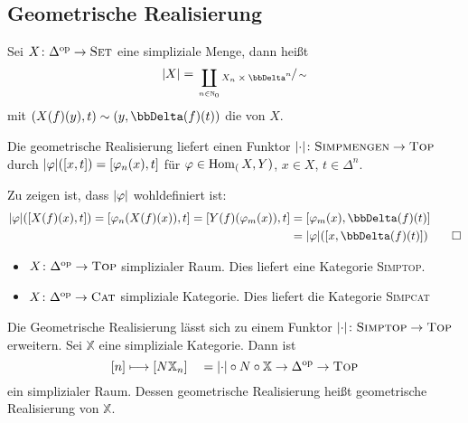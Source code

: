 \subsection{Geometrische Realisierung} %
\label{sub:geometrische_realisierung}

\begin{definition}
	Sei $X \colon \Delta^\op \to \SET$ eine simpliziale Menge, dann heißt
	\[
		\abs*{X} = \sfrac{\coprod_{n \in \mathbb{N}_0} X_n \times \DDelta^n}{\sim}
	\]
	mit $\enbrace*{X(f)(y),t} \sim \enbrace*{y, \DDelta(f)(t)}$ die  von $X$. 
\end{definition}

\begin{satz}
	Die geometrische Realisierung liefert einen Funktor $\abs*{\cdot} \colon \textsc{Simpmengen} \to \TOP$ durch $\abs*{\varphi} \enbrace*{\benbrace*{x,t}} = \benbrace*{\varphi_n(x),t}$ für $\varphi \in \Hom_(X,Y)$, $x \in X$, $t \in \Delta^n$.
\end{satz}
Zu zeigen ist, dass $\abs*{\varphi}$ wohldefiniert ist:
\begin{align}
	\abs*{\varphi} \enbrace*{\benbrace*{X(f)(x),t}}  = \benbrace*{\varphi_n(X(f)(x)),t} = \benbrace*{Y(f) \enbrace*{\varphi_m(x)},t} &= \benbrace*{\varphi_m(x), \DDelta(f)(t)} \\
	&= \abs*{\varphi} \enbrace*{\benbrace*{x, \DDelta(f)(t)}} \qedhere
\end{align}

\begin{definition}
	\begin{itemize}
		\item $X \colon \Delta^\op \to \TOP$ simplizialer Raum.
		Dies liefert eine Kategorie \textsc{Simptop}.
		\item $X \colon \Delta^\op \to \textsc{Cat}$ simpliziale Kategorie. 
		Dies liefert die Kategorie \textsc{Simpcat}
	\end{itemize}
\end{definition}

Die Geometrische Realisierung lässt sich zu einem Funktor $\abs*{\cdot} \colon \textsc{Simptop} \to \TOP$ erweitern.
Sei $\mathbb{X}$ eine simpliziale Kategorie. 
Dann ist 
\[
	\benbrace*{n} \longmapsto \benbrace*{N \mathbb{X}_n} \quad = \abs*{ \cdot } \circ N \circ \mathbb{X} \to \Delta^\op \to \TOP
\]
ein simplizialer Raum.
Dessen geometrische Realisierung heißt geometrische Realisierung von $\mathbb{X}$.

